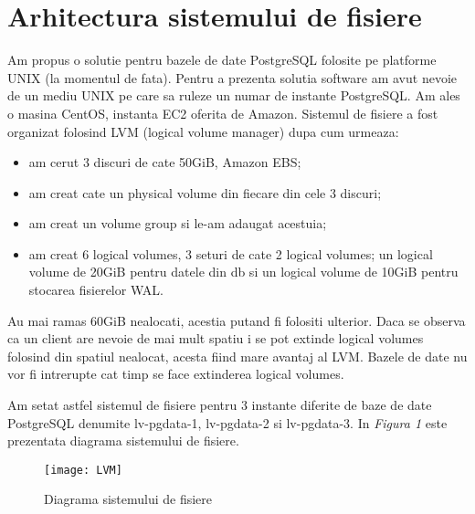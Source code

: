 \section{Arhitectura sistemului de fisiere}
Am propus o solutie pentru bazele de date PostgreSQL folosite pe platforme UNIX (la momentul de fata). Pentru a prezenta solutia software am avut nevoie de un mediu UNIX pe care sa ruleze un numar de instante PostgreSQL. Am ales o masina CentOS, instanta EC2 oferita de Amazon. Sistemul de fisiere a fost organizat folosind LVM (logical volume manager) dupa cum urmeaza:
\begin{itemize}
\item am cerut 3 discuri de cate 50GiB, Amazon EBS;
\item am creat cate un physical volume din fiecare din cele 3 discuri;
\item am creat un volume group si le-am adaugat acestuia;
\item am creat 6 logical volumes, 3 seturi de cate 2 logical volumes; un logical volume de 20GiB pentru datele din db si un logical volume de 10GiB pentru stocarea fisierelor WAL.
\end{itemize}
Au mai ramas 60GiB nealocati, acestia putand fi folositi ulterior. Daca se observa ca un client are nevoie de mai mult spatiu i se pot extinde logical volumes folosind din spatiul nealocat, acesta fiind mare avantaj al LVM. Bazele de date nu vor fi intrerupte cat timp se face extinderea logical volumes.
\par
Am setat astfel sistemul de fisiere pentru 3 instante diferite de baze de date PostgreSQL denumite lv-pgdata-1, lv-pgdata-2 si lv-pgdata-3. In \textit{Figura 1} este prezentata diagrama sistemului de fisiere.
\begin{figure}[h]
	\centering
	\texttt{[image: LVM]}
    \caption{Diagrama sistemului de fisiere}
    \label{fig:diagSistFiles}
\end{figure}